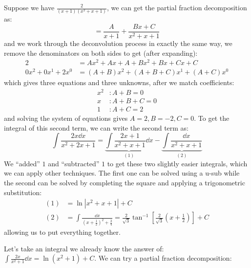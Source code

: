 \begin{itemize}
\begin{equation}
    \end{equation}
    \begin{example}
        Suppose we have $\frac{2}{(x+1)(x^2+x+1)}$, we can get the partial fraction decomposition as:
        \begin{equation}
            =\frac{A}{x+1} + \frac{Bx+C}{x^2+x+1}
        \end{equation}
        and we work through the deconvolution process in exactly the same way, we remove the denominators on both sides to get (after expanding):
        \begin{align}
            2 &= Ax^2+Ax+A+Bx^2+Bx+Cx+C \\ 
            0x^2 + 0x^1 + 2x^0 &= (A+B)x^2 + (A+B+C)x^1 + (A+C)x^0
        \end{align}
        which gives three equations and three unknowns, after we match coefficients:
        \begin{align}
            x^2 &: A+B = 0 \\ 
            x &: A+B+C = 0 \\ 
            1 &: A + C = 2
        \end{align}
        and solving the system of equations gives $A=2, B=-2, C=0$. To get the integral of this second term, we can write the second term as:
        \begin{equation}
            \int \frac{2x \dd{x}}{x^2+2x+1} = \underbrace{\int \frac{2x+1}{x^2+x+1} \dd{x}}_{(1)} - \underbrace{\int \frac{\dd{x}}{x^2+x+1}}_{(2)}
        \end{equation}
        We ``added'' $1$ and ``subtracted'' $1$ to get these two slightly easier integrals, which we can apply other techniques. The first one can be solved using a u-sub while the second can be solved by completing the square and applying a trigonometric substitution:
        \begin{align}
            (1) &= \ln |x^2+x+1| + C \\ 
            (2) &= \int \frac{\dd{x}}{\left(x+\frac{1}{2}\right)^2 + \frac{3}{4}} = \frac{2}{\sqrt{3}}\tan^{-1}\left[\frac{2}{\sqrt{3}}\left(x+\frac{1}{2}\right)\right] + C
        \end{align}
        allowing us to put everything together.
    \end{example}
    \begin{example}
        Let's take an integral we already know the answer of: $\int \frac{2x}{x^2+1} \dd{x} = \ln(x^2+1) + C$. We can try a partial fraction decomposition:
        \begin{equation}

\end{equation}
\end{example}
\end{itemize}
